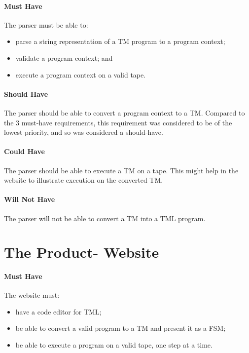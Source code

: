\paragraph{Must Have} The parser must be able to:
\begin{itemize}
    \item parse a string representation of a TM program to a program context;
    \item validate a program context; and 
    \item execute a program context on a valid tape.
\end{itemize}

\paragraph{Should Have} The parser should be able to convert a program context to a TM. Compared to the 3 must-have requirements, this requirement was considered to be of the lowest priority, and so was considered a should-have.

\paragraph{Could Have} The parser should be able to execute a TM on a tape. This might help in the website to illustrate execution on the converted TM.

\paragraph{Will Not Have} The parser will not be able to convert a TM into a TML program.

\section{The Product- Website}

\paragraph{Must Have} The website must:
\begin{itemize}
    \item have a code editor for TML;
    \item be able to convert a valid program to a TM and present it as a FSM;
    \item be able to execute a program on a valid tape, one step at a time.
\end{itemize}


